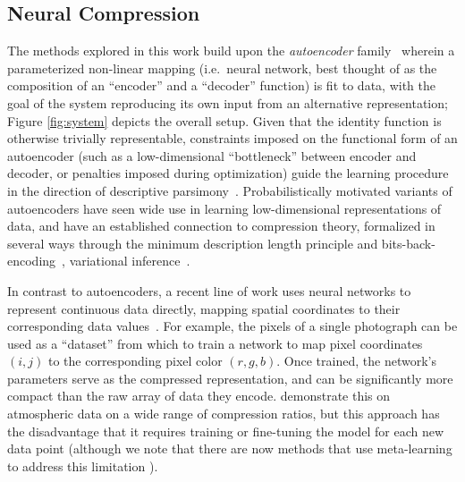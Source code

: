 \subsection{Neural Compression}
\label{sx:methods:networks}

The methods explored in this work build upon the \emph{autoencoder} family~\citep{ackley1985learning,hinton1990connectionist} wherein a parameterized non-linear mapping (i.e.\ neural network, best thought of as the composition of an ``encoder'' and a ``decoder'' function) is fit to data, with the goal of the system reproducing its own input from an alternative representation; Figure \ref{fig:system} depicts the overall setup.
Given that the identity function is otherwise trivially representable, constraints imposed on the functional form of an autoencoder (such as a low-dimensional ``bottleneck'' between encoder and decoder, or penalties imposed during optimization) guide the learning procedure in the direction of descriptive parsimony~\citep{elman1988learning,Cottrell1987}.
Probabilistically motivated variants of autoencoders have seen wide use in learning low-dimensional representations of data, and have an established connection to compression theory, formalized in several ways through the minimum description length principle and bits-back-encoding~\citep{hinton1993autoencoders, grunwald2007minimum}, variational inference~\citep{rezende2014reparameterizationtrick,kingma2014vae}.

In contrast to autoencoders, a recent line of work uses neural networks to represent continuous data directly, mapping spatial coordinates to their corresponding data values~\citep{dupont2022functa, xie2022neural_fields_beyond}. For example, the pixels of a single photograph can be used as a ``dataset'' from which to train a network to map pixel coordinates $(i, j)$ to the corresponding pixel color $(r, g, b)$. Once trained, the network's parameters serve as the compressed representation, and can be significantly more compact than the raw array of data they encode.
\citet{huang2022compressing} demonstrate this on atmospheric data on a wide range of compression ratios, but this approach has the disadvantage that it requires training or fine-tuning the model for each new data point (although we note that there are now methods that use meta-learning to address this limitation \citep{coinplusplus_2022}).




